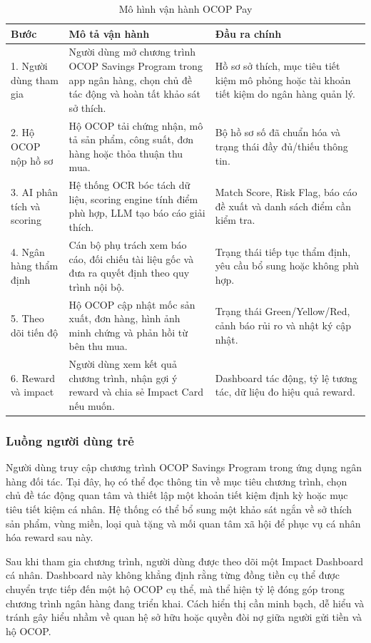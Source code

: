 \documentclass[13pt,a4paper]{extarticle}
\begin{document}
\begin{table}[H]
\centering
\caption{Mô hình vận hành OCOP Pay}
\begin{tabular}{|p{1.5cm}|p{5.5cm}|p{6cm}|}
\hline
\textbf{Bước} & \textbf{Mô tả vận hành} & \textbf{Đầu ra chính} \\
\hline
1. Người dùng tham gia & Người dùng mở chương trình OCOP Savings Program trong app ngân hàng, chọn chủ đề tác động và hoàn tất khảo sát sở thích. & Hồ sơ sở thích, mục tiêu tiết kiệm mô phỏng hoặc tài khoản tiết kiệm do ngân hàng quản lý. \\
\hline
2. Hộ OCOP nộp hồ sơ & Hộ OCOP tải chứng nhận, mô tả sản phẩm, công suất, đơn hàng hoặc thỏa thuận thu mua. & Bộ hồ sơ số đã chuẩn hóa và trạng thái đầy đủ/thiếu thông tin. \\
\hline
3. AI phân tích và scoring & Hệ thống OCR bóc tách dữ liệu, scoring engine tính điểm phù hợp, LLM tạo báo cáo giải thích. & Match Score, Risk Flag, báo cáo đề xuất và danh sách điểm cần kiểm tra. \\
\hline
4. Ngân hàng thẩm định & Cán bộ phụ trách xem báo cáo, đối chiếu tài liệu gốc và đưa ra quyết định theo quy trình nội bộ. & Trạng thái tiếp tục thẩm định, yêu cầu bổ sung hoặc không phù hợp. \\
\hline
5. Theo dõi tiến độ & Hộ OCOP cập nhật mốc sản xuất, đơn hàng, hình ảnh minh chứng và phản hồi từ bên thu mua. & Trạng thái Green/Yellow/Red, cảnh báo rủi ro và nhật ký cập nhật. \\
\hline
6. Reward và impact & Người dùng xem kết quả chương trình, nhận gợi ý reward và chia sẻ Impact Card nếu muốn. & Dashboard tác động, tỷ lệ tương tác, dữ liệu đo hiệu quả reward. \\
\hline
\end{tabular}
\end{table}

\subsubsection{Luồng người dùng trẻ}

Người dùng truy cập chương trình OCOP Savings Program trong ứng dụng ngân hàng đối tác. Tại đây, họ có thể đọc thông tin về mục tiêu chương trình, chọn chủ đề tác động quan tâm và thiết lập một khoản tiết kiệm định kỳ hoặc mục tiêu tiết kiệm cá nhân. Hệ thống có thể bổ sung một khảo sát ngắn về sở thích sản phẩm, vùng miền, loại quà tặng và mối quan tâm xã hội để phục vụ cá nhân hóa reward sau này.

Sau khi tham gia chương trình, người dùng được theo dõi một Impact Dashboard cá nhân. Dashboard này không khẳng định rằng từng đồng tiền cụ thể được chuyển trực tiếp đến một hộ OCOP cụ thể, mà thể hiện tỷ lệ đóng góp trong chương trình ngân hàng đang triển khai. Cách hiển thị cần minh bạch, dễ hiểu và tránh gây hiểu nhầm về quan hệ sở hữu hoặc quyền đòi nợ giữa người gửi tiền và hộ OCOP.
\end{document}
